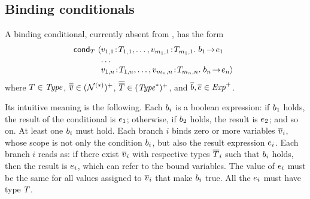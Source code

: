 
\subsection{Binding conditionals}

A binding conditional, currently absent from \cite{lm}, has the form
\[
\bcondFTL{\typ}
         {\bcondbrFT{\var_{1,1}}{\typ_{1,1}}{\var_{m_1,1}}{\typ_{m_1,1}}
                    {\bexpr_1}{\expr_1}}
         {\bcondbrFT{\var_{1,n}}{\typ_{1,n}}{\var_{m_n,n}}{\typ_{m_n,n}}
                    {\bexpr_n}{\expr_n}}
\]
where $T\in\mathit{Type}$, $\overline{\overline{v}}\in(\mathcal{N}^{(\ast)})^+$,
$\overline{\overline{T}}\in(\mathit{Type}^\ast)^+$, and
$\overline{b},\overline{e}\in\mathit{Exp}^+$.

Its intuitive meaning is the following. Each $b_i$ is a boolean
expression: if $b_1$ holds, the result of the conditional is $e_1$;
otherwise, if $b_2$ holds, the result is $e_2$; and so on. At least
one $b_i$ must hold. Each branch $i$ binds zero or more variables
$\overline{v}_i$, whose scope is not only the condition $b_i$, but also the
result expression $e_i$. Each branch $i$ reads as: if there exist
$\overline{v}_i$ with respective types $\overline{T}_i$ such that $b_i$ holds, then the
result is $e_i$, which can refer to the bound variables. The value of
$e_i$ must be the same for all values assigned to $\overline{v}_i$ that make
$b_i$ true. All the $e_i$ must have type $T$.

